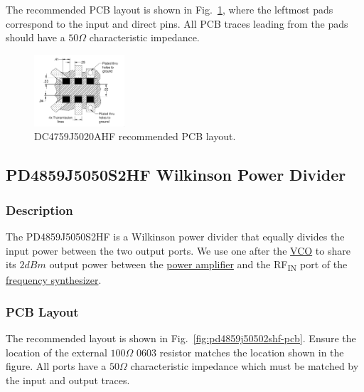The recommended PCB layout is shown in Fig.~\ref{fig:dc4759j5020ahf-pcb}, where the leftmost pads
correspond to the input and direct pins. All PCB traces leading from the pads should have a $50
\si{\Omega}$ characteristic impedance.

\begin{figure}[h]
        \centering
        \includegraphics[width=0.3\textwidth]{data/dc4759j5020ahf-pcb}
        \caption{DC4759J5020AHF recommended PCB layout.}
        \label{fig:dc4759j5020ahf-pcb}
\end{figure}

\subsection{PD4859J5050S2HF Wilkinson Power Divider}
\label{sec:pd4859j5050s2hf}

\subsubsection{Description}
\label{sec:pd4859j5050s2hf-description}

The PD4859J5050S2HF is a Wilkinson power divider that equally divides the input power between the
two output ports. We use one after the \hyperref[sec:hmc431lp4rf]{VCO} to share its $2 \si{dBm}$
output power between the \hyperref[sec:se2567l]{power amplifier} and the RF\textsubscript{IN} port
of the \hyperref[sec:adf4158]{frequency synthesizer}.

\subsubsection{PCB Layout}
\label{sec:pd4859j50502shf-pcb}

The recommended layout is shown in Fig.~\ref{fig:pd4859j50502shf-pcb}. Ensure the location of the
external $100 \si{\Omega}$ 0603 resistor matches the location shown in the figure. All ports have a
$50 \si{\Omega}$ characteristic impedance which must be matched by the input and output traces.

